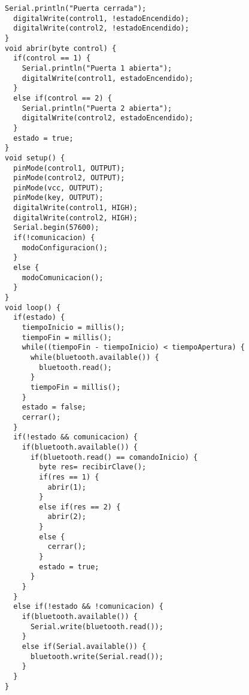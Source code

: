 \begin{lstlisting}[label=anx:programa_respaldo_bluetooth]
  Serial.println("Puerta cerrada");
  digitalWrite(control1, !estadoEncendido);
  digitalWrite(control2, !estadoEncendido);
}
void abrir(byte control) {
  if(control == 1) {
    Serial.println("Puerta 1 abierta");
    digitalWrite(control1, estadoEncendido);
  }
  else if(control == 2) {
    Serial.println("Puerta 2 abierta");
    digitalWrite(control2, estadoEncendido);
  }
  estado = true;
}
void setup() {
  pinMode(control1, OUTPUT);
  pinMode(control2, OUTPUT);
  pinMode(vcc, OUTPUT);
  pinMode(key, OUTPUT);
  digitalWrite(control1, HIGH);
  digitalWrite(control2, HIGH);
  Serial.begin(57600);
  if(!comunicacion) {
    modoConfiguracion();
  }
  else {
    modoComunicacion();
  }
}
void loop() {
  if(estado) {
    tiempoInicio = millis();
    tiempoFin = millis();
    while((tiempoFin - tiempoInicio) < tiempoApertura) {
      while(bluetooth.available()) {
        bluetooth.read();
      }
      tiempoFin = millis();
    }
    estado = false;
    cerrar();
  }
  if(!estado && comunicacion) {
    if(bluetooth.available()) {
      if(bluetooth.read() == comandoInicio) {
        byte res= recibirClave();
        if(res == 1) {
          abrir(1);
        }
        else if(res == 2) {
          abrir(2);
        }
        else {
          cerrar();
        }
        estado = true;
      }
    }
  }
  else if(!estado && !comunicacion) {
    if(bluetooth.available()) {
      Serial.write(bluetooth.read());
    }
    else if(Serial.available()) {
      bluetooth.write(Serial.read());
    }
  }
}
\end{lstlisting}
